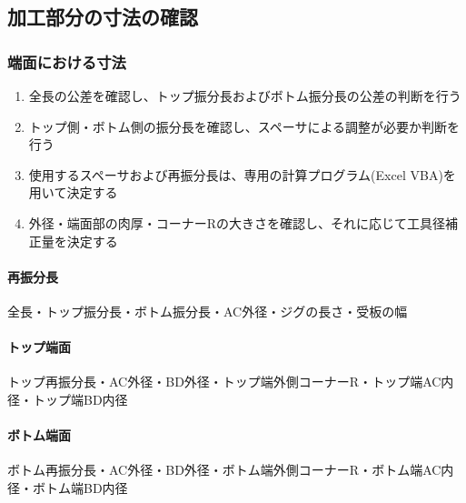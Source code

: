 \clearpage
\subsection{加工部分の寸法の確認}

\subsubsection{端面における寸法}
\begin{enumerate}
\item {}全長の公差を確認し、トップ振分長およびボトム振分長の公差の判断を行う
\item トップ側・ボトム側の振分長を確認し、スペーサによる調整が必要か判断を行う
\item 使用するスペーサおよび再振分長は、専用の計算プログラム(Excel VBA)を用いて決定する
\item 外径・端面部の肉厚・コーナーRの大きさを確認し、それに応じて工具径補正量を決定する
\end{enumerate}
\begin{Tabbox}[title={必要な図面上のパラメタ}]\small
\paragraph*{再振分長}
全長・トップ振分長・ボトム振分長・AC外径・ジグの長さ・受板の幅
\tcbline*
\paragraph*{トップ端面}
トップ再振分長・AC外径・BD外径・トップ端外側コーナーR・トップ端AC内径・トップ端BD内径
\tcbline*
\paragraph*{ボトム端面}
ボトム再振分長・AC外径・BD外径・ボトム端外側コーナーR・ボトム端AC内径・ボトム端BD内径
\end{Tabbox}

